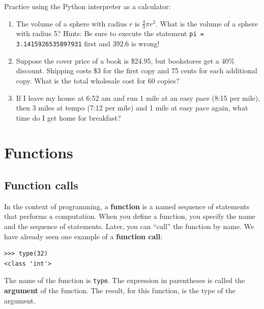 \documentclass[10pt]{book}
\begin{document}
\begin{ex}
Practice using the Python interpreter as a calculator: 

\begin{enumerate}

\item The volume of a sphere with radius $r$ is $\frac{4}{3} \pi r^3$.
  What is the volume of a sphere with radius 5?  Hints: Be sure to execute the statement {\tt pi = 3.1415926535897931} first and 392.6 is wrong!

\item Suppose the cover price of a book is \$24.95, but bookstores get a
  40\% discount.  Shipping costs \$3 for the first copy and 75 cents
  for each additional copy.  What is the total wholesale cost for
  60 copies?

\item If I leave my house at 6:52 am and run 1 mile at an easy pace
  (8:15 per mile), then 3 miles at tempo (7:12 per mile) and 1 mile at
  easy pace again, what time do I get home for breakfast?


\end{enumerate}
\end{ex}


\chapter{Functions}
\label{funcchap}

\section{Function calls}
\label{functionchap}

In the context of programming, a {\bf function} is a named sequence of
statements that performs a computation.  When you define a function,
you specify the name and the sequence of statements.  Later, you can
``call'' the function by name.  
We have already seen one example of a {\bf function call}:

\beforeverb
\begin{verbatim}
>>> type(32)
<class 'int'>
\end{verbatim}
\afterverb
%
The name of the function is {\tt type}.  The expression in parentheses
is called the {\bf argument} of the function.  The result, for this
function, is the type of the argument.

\end{document}
